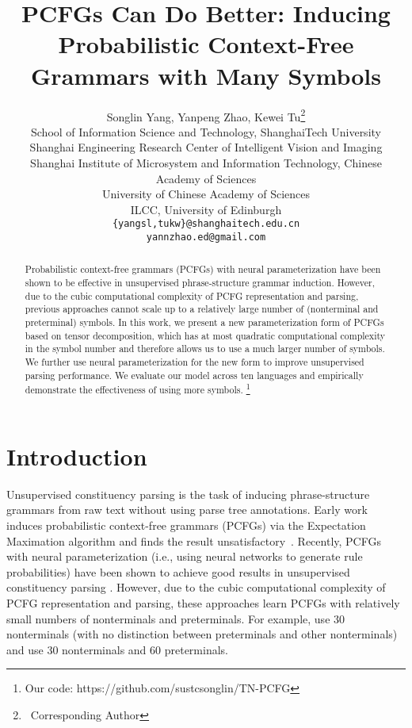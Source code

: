 \documentclass[11pt]{article}
\title{PCFGs Can Do Better: Inducing \\ Probabilistic Context-Free Grammars with Many Symbols}
\author{Songlin Yang, Yanpeng Zhao, Kewei Tu\thanks{\, 	 Corresponding Author}\\
  School of Information Science and Technology, ShanghaiTech University \\
  \textsuperscript{}{Shanghai Engineering Research Center of Intelligent Vision and Imaging}\\
  \textsuperscript{}{Shanghai Institute of Microsystem and Information Technology, Chinese Academy of Sciences}\\
    \textsuperscript{}{University of Chinese Academy of Sciences}\\
 {ILCC, University of Edinburgh}\\
    {\tt \{yangsl,tukw\}@shanghaitech.edu.cn}\\
    {\tt yannzhao.ed@gmail.com}
 }
\begin{document}
\maketitle
\begin{abstract}
Probabilistic context-free grammars (PCFGs) with neural parameterization have been shown to be effective in unsupervised phrase-structure grammar induction.
However, due to the cubic computational complexity of PCFG representation and parsing,
previous approaches cannot scale up to a relatively large number of (nonterminal and preterminal) symbols.
In this work, we present a new parameterization form of PCFGs based on tensor decomposition,
which has at most quadratic computational complexity in the symbol number and therefore allows us to use a much larger number of symbols.
We further use neural parameterization for the new form to improve unsupervised parsing performance.
We evaluate our model across ten languages and empirically demonstrate the effectiveness of using more symbols. \footnote{Our code: https://github.com/sustcsonglin/TN-PCFG}
\end{abstract}

\section{Introduction}

Unsupervised constituency parsing is the task of inducing phrase-structure grammars from raw text without using parse tree annotations.
Early work induces probabilistic context-free grammars (PCFGs) via the Expectation Maximation algorithm and finds the result unsatisfactory~\citep{lari1990estimation,carroll1992two}.
Recently, PCFGs with neural parameterization (i.e., using neural networks to generate rule probabilities) have been shown to achieve good results in unsupervised constituency parsing \cite{kim-etal-2019-compound,jin-etal-2019-unsupervised,zhu2020return}.
However, due to the cubic computational complexity of PCFG representation and parsing, these approaches learn PCFGs with relatively small numbers of nonterminals and preterminals. For example, \citet{jin-etal-2019-unsupervised} use 30 nonterminals (with no distinction between preterminals and other nonterminals) and \citet{kim-etal-2019-compound} use 30 nonterminals and 60 preterminals.
\end{document}
